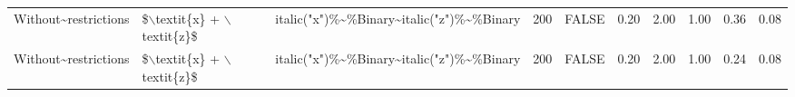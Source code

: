 \begin{longtable}{lllrlrrrrr}
  Without\~{}restrictions & \$$\backslash$textit\{x\} + $\backslash$textit\{z\}\$ & italic("x")\%\~{}\%Binary\~{}italic("z")\%\~{}\%Binary & 200 & FALSE & 0.20 & 2.00 & 1.00 & 0.36 & 0.08 \\ 
  Without\~{}restrictions & \$$\backslash$textit\{x\} + $\backslash$textit\{z\}\$ & italic("x")\%\~{}\%Binary\~{}italic("z")\%\~{}\%Binary & 200 & FALSE & 0.20 & 2.00 & 1.00 & 0.24 & 0.08 \\ 
   \hline
\hline
\end{longtable}
